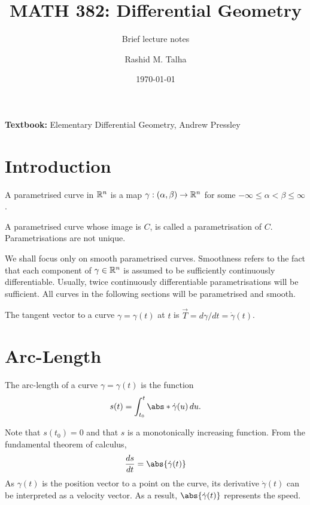 \documentclass[11pt]{penrose}
\title{MATH 382: Differential Geometry}
\subtitle{Brief lecture notes}
\author{Rashid M. Talha}
\affiliation{School of Natural Sciences, NUST}
\date{\today}
\newcommand{\vT}{\vec{T}}
\begin{document}
\maketitle

\textbf{Textbook:} Elementary Differential Geometry, Andrew Pressley

\section{Introduction}
\begin{ndfn}
    A parametrised curve in $\mathbb{R}^n$ is a map $\gamma : (\alpha, \beta) \to \mathbb{R}^n$ for some $-\infty \leq \alpha < \beta \leq \infty$.

    A parametrised curve whose image is $C$, is called a parametrisation of $C$. Parametrisations are not unique.
\end{ndfn}

We shall focus only on smooth parametrised curves. Smoothness refers to the fact that each component of $\gamma \in \mathbb{R}^n$ is assumed to be sufficiently continuously differentiable. Usually, twice continuously differentiable parametrisations will be sufficient. All curves in the following sections will be parametrised and smooth.

\begin{ndfn}
    The tangent vector to a curve $\gamma = \gamma(t)$ at $t$ is $\vT = d\gamma/dt = \dot{\gamma}(t)$.
\end{ndfn}


\section{Arc-Length}
\begin{ndfn}
    The arc-length of a curve $\gamma = \gamma(t)$ is the function
    \begin{equation}
        s(t) = \int_{t_0}^{t} \abs*{\dot{\gamma}(u)} \,du.
    \end{equation}
\end{ndfn}

Note that $s(t_0) = 0$ and that $s$ is a monotonically increasing function. From the fundamental theorem of calculus,
\begin{equation}
    \frac{ds}{dt} = \abs{\dot{\gamma}(t)}
\end{equation}
As $\gamma(t)$ is the position vector to a point on the curve, its derivative $\dot{\gamma}(t)$ can be interpreted as a velocity vector. As a result, $\abs{\dot{\gamma}(t)}$ represents the speed.
\end{document}
